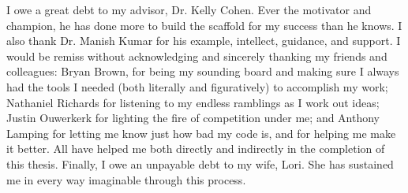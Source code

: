 I owe a great debt to my advisor, Dr. Kelly Cohen. Ever the motivator and champion, he has done more to build
the scaffold for my success than he knows. I also thank Dr. Manish Kumar for his example, intellect, guidance,
and support. I would be remiss without acknowledging and sincerely thanking my friends and colleagues: Bryan
Brown, for being my sounding board and making sure I always had the tools I needed (both literally and
figuratively) to accomplish my work; Nathaniel Richards for listening to my endless ramblings as I work out
ideas; Justin Ouwerkerk for lighting the fire of competition under me; and Anthony Lamping for letting me know
just how bad my code is, and for helping me make it better. All have helped me both directly and indirectly in
the completion of this thesis. Finally, I owe an unpayable debt to my wife, Lori. She has sustained me in
every way imaginable through this process. 

